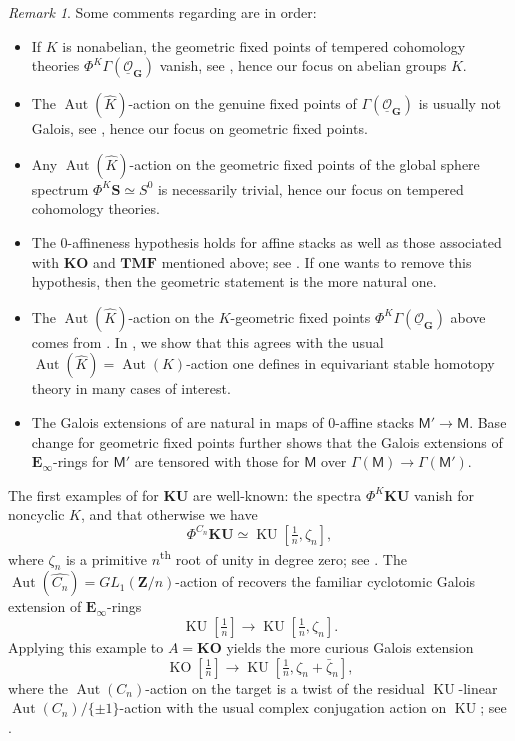 \documentclass[11pt, a4paper]{article}
\newcommand{\1}{\mathbf{1}}
\DeclareMathOperator{\KU}{KU}
\newcommand{\gKU}{{\mathbf{KU}}}
\newcommand{\gKO}{{\mathbf{KO}}}
\newcommand{\gTMF}{{\mathbf{TMF}}}
\DeclareMathOperator{\KO}{KO}
\newcommand{\Sph}{\mathbf{S}}
\DeclareMathOperator{\Aut}{Aut}
\newcommand{\ul}[1]{\underline{#1}}
\newcommand{\dual}[1]{{\widehat{#1}}}
\newcommand{\E}{\mathbf{E}}
\newcommand{\G}{\mathbf{G}}
\newcommand{\M}{\mathsf{M}}
\renewcommand{\O}{\mathcal{O}}
\newcommand{\Z}{\mathbf{Z}}
\newcommand{\Ga}{\Gamma}
\theoremstyle{plain}
\theoremstyle{definition}
\theoremstyle{remark}\numberwithin{equation}{section}
\newtheorem{remark}[equation]{Remark}
\begin{document}
\begin{remark}
    Some comments regarding  are in order:
        \begin{itemize}
            \item If $K$ is nonabelian, the geometric fixed points of tempered cohomology theories $\Phi^K \Ga(\ul{\O}_\G)$ vanish, see \cite[Pr.5.4.4]{temperedglobal}, hence our focus on abelian groups $K$.
            \item The $\Aut(\dual{K})$-action on the genuine fixed points of $\Ga(\ul{\O}_\G)$ is usually not Galois, see , hence our focus on geometric fixed points.
            \item Any $\Aut(\dual{K})$-action on the geometric fixed points of the global sphere spectrum $\Phi^K \Sph \simeq S^0$ is necessarily trivial, hence our focus on tempered cohomology theories.
            \item The 0-affineness hypothesis holds for affine stacks as well as those associated with $\gKO$ and $\gTMF$ mentioned above; see \cite{akhilandlennart,reconstruction}. If one wants to remove this hypothesis, then the geometric statement  is the more natural one.
            \item The $\Aut(\dual{K})$-action on the $K$-geometric fixed points $\Phi^K \Ga(\ul{\O}_\G)$ above comes from . In , we show that this agrees with the usual $\Aut(\dual{K}) = \Aut(K)$-action one defines in equivariant stable homotopy theory in many cases of interest.
            \item The Galois extensions of  are natural in maps of 0-affine stacks $\M' \to \M$. Base change for geometric fixed points \cite[Th.E]{temperedglobal} further shows that the Galois extensions of $\E_\infty$-rings for $\M'$ are tensored with those for $\M$ over $\Ga(\M) \to \Ga(\M')$.
        \end{itemize}
\end{remark}

The first examples of  for $\gKU$ are well-known: the spectra $\Phi^K \gKU$ vanish for noncyclic $K$, and that otherwise we have
    \[\Phi^{C_n} \gKU \simeq \KU[\tfrac{1}{n}, \zeta_n],\]
where $\zeta_n$ is a primitive $n$\textsuperscript{th} root of unity in degree zero; see \cite[]{tomdieck_transformation_groups}. The $\Aut(\dual{C_n}) = GL_1(\Z/n)$-action of  recovers the familiar cyclotomic Galois extension of $\E_\infty$-rings
\[\KU[\tfrac{1}{n}] \to \KU[\tfrac{1}{n}, \zeta_n].\]
Applying this example to $A=\gKO$ yields the more curious Galois extension
\[\KO[\tfrac{1}{n}] \to \KU[\tfrac{1}{n}, \zeta_n + \bar{\zeta}_n],\]
where the $\Aut(C_n)$-action on the target is a twist of the residual $\KU$-linear $\Aut(C_n)/\{\pm 1\}$-action with the usual complex conjugation action on $\KU$; see .
\end{document}
